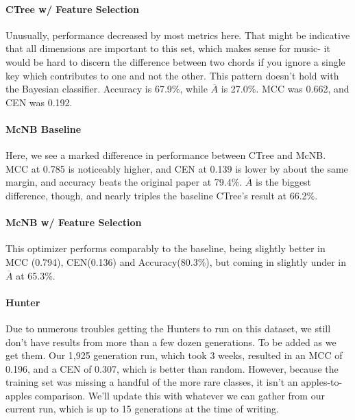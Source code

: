 \paragraph{CTree w/ Feature Selection}	
Unusually, performance decreased by most metrics here.  That might be indicative that all dimensions are important to this set, which makes sense for music- it would be hard to discern the difference between two chords if you ignore a single key which contributes to one and not the other.  This pattern doesn't hold with the Bayesian classifier.  Accuracy is 67.9\%, while $\overline{A}$ is 27.0\%.    MCC was 0.662, and CEN was 0.192.
\paragraph{McNB Baseline}
Here, we see a marked difference in performance between CTree and McNB.  MCC at 0.785 is noticeably higher, and CEN at 0.139 is lower by about the same margin, and accuracy beats the original paper at 79.4\%.  $\overline{A}$ is the biggest difference, though, and nearly triples the baseline CTree's result at 66.2\%.
\paragraph{McNB w/ Feature Selection}
This optimizer performs comparably to the baseline, being slightly better in MCC (0.794), CEN(0.136) and Accuracy(80.3\%), but coming in slightly under in $\overline{A}$ at 65.3\%.  
\paragraph{Hunter}
Due to numerous troubles getting the Hunters to run on this dataset, we still don't have results from more than a few dozen generations.  To be added as we get them.  Our 1,925 generation run, which took 3 weeks, resulted in an MCC of 0.196, and a CEN of 0.307, which is better than random.  However, because the training set was missing a handful of the more rare classes, it isn't an apples-to-apples comparison.  We'll update this with whatever we can gather from our current run, which is up to 15 generations at the time of writing.

